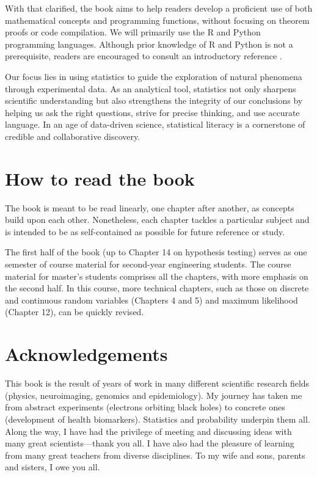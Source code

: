 \documentclass[
]{book}
\begin{document}
With that clarified, the book aims to help readers develop a proficient use of both mathematical concepts and programming functions, without focusing on theorem proofs or code compilation. We will primarily use the R and Python programming languages. Although prior knowledge of R and Python is not a prerequisite, readers are encouraged to consult an introductory reference \citep{matloff2011art, mckinney2022python}.

Our focus lies in using statistics to guide the exploration of natural phenomena through experimental data. As an analytical tool, statistics not only sharpens scientific understanding but also strengthens the integrity of our conclusions by helping us ask the right questions, strive for precise thinking, and use accurate language. In an age of data-driven science, statistical literacy is a cornerstone of credible and collaborative discovery.

\hypertarget{how-to-read-the-book}{%
\section{How to read the book}\label{how-to-read-the-book}}

The book is meant to be read linearly, one chapter after another, as concepts build upon each other. Nonetheless, each chapter tackles a particular subject and is intended to be as self-contained as possible for future reference or study.

The first half of the book (up to Chapter 14 on hypothesis testing) serves as one semester of course material for second-year engineering students. The course material for master's students comprises all the chapters, with more emphasis on the second half. In this course, more technical chapters, such as those on discrete and continuous random variables (Chapters 4 and 5) and maximum likelihood (Chapter 12), can be quickly revised.

\hypertarget{acknowledgements}{%
\section{Acknowledgements}\label{acknowledgements}}

This book is the result of years of work in many different scientific research fields (physics, neuroimaging, genomics and epidemiology). My journey has taken me from abstract experiments (electrons orbiting black holes) to concrete ones (development of health biomarkers). Statistics and probability underpin them all. Along the way, I have had the privilege of meeting and discussing ideas with many great scientists---thank you all. I have also had the pleasure of learning from many great teachers from diverse disciplines. To my wife and sons, parents and sisters, I owe you all.
\end{document}
